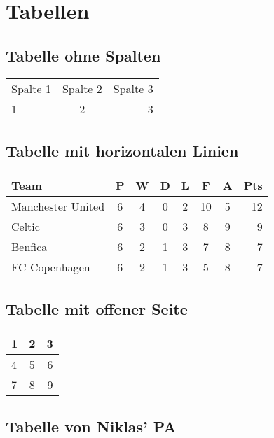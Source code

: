 \chapter{Tabellen}

\section{Tabelle ohne Spalten}

\begin{tabular}{lcr}
    Spalte 1 & Spalte 2 & Spalte 3 \\
    1 & 2 & 3 \\
\end{tabular}

\section{Tabelle mit horizontalen Linien}

\begin{tabular}{l*{6}{c}r}
    \toprule
    Team              & P & W & D & L & F  & A & Pts \\
    \midrule
    Manchester United & 6 & 4 & 0 & 2 & 10 & 5 & 12  \\
    Celtic            & 6 & 3 & 0 & 3 &  8 & 9 &  9  \\
    Benfica           & 6 & 2 & 1 & 3 &  7 & 8 &  7  \\
    FC Copenhagen     & 6 & 2 & 1 & 3 &  5 & 8 &  7  \\
    \bottomrule
\end{tabular}

\section{Tabelle mit offener Seite}

\begin{center}
    \begin{tabular}{ | l | c | r }
      \hline
      1 & 2 & 3 \\ \hline
      4 & 5 & 6 \\ \hline
      7 & 8 & 9 \\
      \hline
    \end{tabular}
  \end{center}

\section{Tabelle von Niklas' PA}

